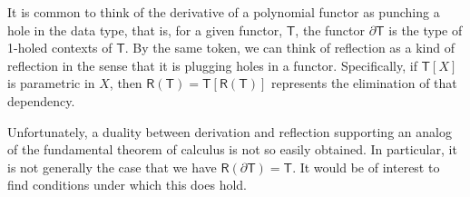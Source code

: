 It is common to think of the derivative of a polynomial functor as
punching a hole in the data type, that is, for a given functor,
$\mathsf{T}$, the functor $\partial\mathsf{T}$ is the type of 1-holed
contexts of $\mathsf{T}$. By the same token, we can think of
reflection as a kind of reflection in the sense that it is plugging
holes in a functor. Specifically, if $\mathsf{T}[X]$ is parametric in
$X$, then $\mathsf{R}(\mathsf{T}) =
\mathsf{T}[\mathsf{R}(\mathsf{T})]$ represents the elimination of that
dependency.

Unfortunately, a duality between derivation and reflection supporting
an analog of the fundamental theorem of calculus is not so easily
obtained. In particular, it is not generally the case that we have
$\mathsf{R}(\partial \mathsf{T}) = \mathsf{T}$. It would be of
interest to find conditions under which this does hold.
